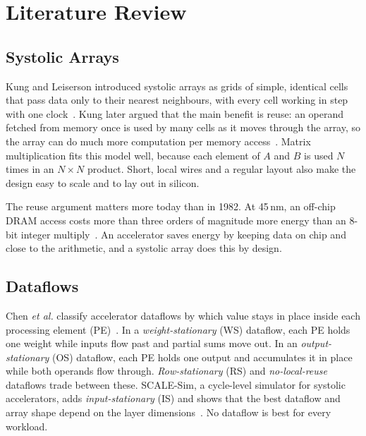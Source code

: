
\section{Literature Review}

\subsection{Systolic Arrays}
Kung and Leiserson introduced systolic arrays as grids of simple, identical cells that pass data only to their nearest neighbours, with every cell working in step with one clock~\cite{kung1979systolic}. Kung later argued that the main benefit is reuse: an operand fetched from memory once is used by many cells as it moves through the array, so the array can do much more computation per memory access~\cite{kung1982systolic}. Matrix multiplication fits this model well, because each element of $A$ and $B$ is used $N$ times in an $N \times N$ product. Short, local wires and a regular layout also make the design easy to scale and to lay out in silicon.

The reuse argument matters more today than in 1982. At 45\,nm, an off-chip DRAM access costs more than three orders of magnitude more energy than an 8-bit integer multiply~\cite{horowitz2014energy}. An accelerator saves energy by keeping data on chip and close to the arithmetic, and a systolic array does this by design.

\subsection{Dataflows}
Chen \emph{et al.} classify accelerator dataflows by which value stays in place inside each processing element (PE)~\cite{chen2016eyeriss, sze2017efficient}. In a \emph{weight-stationary} (WS) dataflow, each PE holds one weight while inputs flow past and partial sums move out. In an \emph{output-stationary} (OS) dataflow, each PE holds one output and accumulates it in place while both operands flow through. \emph{Row-stationary} (RS) and \emph{no-local-reuse} dataflows trade between these. SCALE-Sim, a cycle-level simulator for systolic accelerators, adds \emph{input-stationary} (IS) and shows that the best dataflow and array shape depend on the layer dimensions~\cite{samajdar2020scalesim}. No dataflow is best for every workload.

